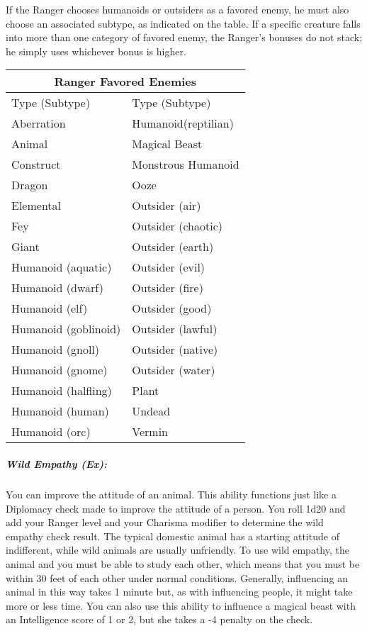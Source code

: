 If the Ranger chooses humanoids or outsiders as a favored enemy, he must also choose an associated subtype, as indicated on the table. 
If a specific creature falls into more than one category of favored enemy, the Ranger's bonuses do not stack; he simply uses whichever bonus is higher.

\begin{center}
\small
\begin{tabular}{|p{3.2cm}|p{3.2cm}|}
\multicolumn{2}{c}{\textbf{\normalsize Ranger Favored Enemies}}\\
\hline
Type (Subtype)&Type (Subtype)\\
\hline
Aberration&Humanoid(reptilian)\\
Animal&Magical Beast\\
Construct&Monstrous Humanoid\\
Dragon&Ooze\\
Elemental&Outsider (air)\\
Fey&Outsider (chaotic)\\
Giant&Outsider (earth)\\
Humanoid (aquatic)&Outsider (evil)\\
Humanoid (dwarf)&Outsider (fire)\\
Humanoid (elf)&Outsider (good)\\
Humanoid (goblinoid)&Outsider (lawful)\\
Humanoid (gnoll)&Outsider (native)\\
Humanoid (gnome)&Outsider (water)\\
Humanoid (halfling)&Plant\\
Humanoid (human)&Undead\\
Humanoid (orc)&Vermin\\
\hline
\end{tabular}
\end{center}
\subparagraph[Wild Empathy]{Wild Empathy (Ex):}
\label{sec:WildEmpathy}
You can improve the attitude of an animal.
This ability functions just like a Diplomacy check made to improve the attitude of a person. 
You roll 1d20 and add your Ranger level and your Charisma modifier to determine the wild empathy check result.
The typical domestic animal has a starting attitude of indifferent, while wild animals are usually unfriendly.
To use wild empathy, the animal and you must be able to study each other, 
which means that you must be within 30 feet of each other under normal conditions. 
Generally, influencing an animal in this way takes 1 minute but, as with influencing people, it might take more or less time.
You can also use this ability to influence a magical beast with an Intelligence score of 1 or 2, but she takes a -4 penalty on the check.
